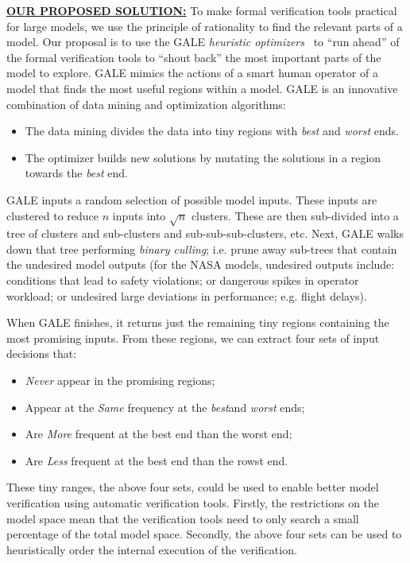 \documentclass[12pt]{article}
\newcommand{\bi}{\begin{itemize}[leftmargin=0.4cm]}
\newcommand{\ei}{\end{itemize}}
\begin{document}
\underline{{\bf  OUR PROPOSED SOLUTION:}} 
To make formal verification tools practical for large models,
we use  the   principle of rationality to find the relevant parts of a model.
Our proposal is to use the  GALE {\em  heuristic optimizers}~\cite{krall2015gale} to  ``run ahead'' of the formal verification tools to ``shout back'' the most important parts of the model to explore.   
GALE mimics the actions of a smart human operator of a model that finds the most useful regions within a model.
GALE
is an innovative combination of data mining and 
optimization algorithms:
\bi
\item
The data mining divides the data into tiny regions
with {\em best} and {\em worst} ends.
\item
The optimizer builds new solutions by mutating  the solutions
in a region towards the {\em best} end.
\ei
GALE inputs a random selection of possible model inputs. These
 inputs are clustered to   reduce  $n$ inputs into $\sqrt{n}$ clusters.
 These are then sub-divided into a tree of clusters and sub-clusters and sub-sub-sub-clusters, etc. Next, GALE walks down that tree performing {\em binary culling};
 i.e. prune away sub-trees that contain the undesired model outputs (for the NASA models,
 undesired outputs include: conditions that lead to safety violations; or dangerous spikes in operator workload; or undesired large deviations in performance; e.g. flight delays).

\newcommand{\KK}[1] {\em {\sffamily #1}}
When GALE finishes, it returns just the remaining tiny
regions   containing the most promising inputs.
From these regions, we can extract four sets of  input decisions that:
\bi
\item  {\KK Never} appear in the promising regions;
\item Appear at the {\KK Same} frequency at the {\em best}and {\em worst} ends;
\item Are {\KK More} frequent at the best end than the worst end;
\item Are {\KK Less} frequent at the best  end than the rowst end.
\ei
These tiny ranges, the above four sets, could be used
to enable better model verification using automatic verification tools. Firstly, the restrictions on the model
space mean that the verification tools need to only search
a small percentage of the total model space. Secondly,
the above four sets can be used to heuristically order the internal execution of the verification.
\end{document}
